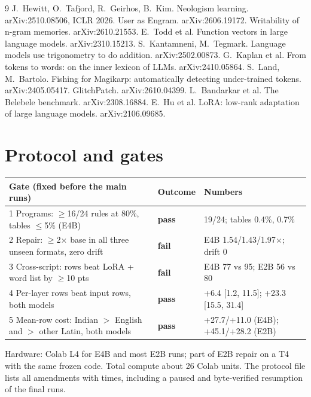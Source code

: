 \documentclass[10pt]{article}
\newcommand{\PASS}{\textcolor{pass}{\textbf{pass}}}\newcommand{\FAIL}{\textcolor{fail}{\textbf{fail}}}
\begin{document}
{\small
\begin{thebibliography}{9}\setlength{\itemsep}{1pt}
 J.~Hewitt, O.~Tafjord, R.~Geirhos, B.~Kim. Neologism learning. arXiv:2510.08506, ICLR 2026.
 User as Engram. arXiv:2606.19172.
 Writability of n-gram memories. arXiv:2610.21553.
 E.~Todd et al. Function vectors in large language models. arXiv:2310.15213.
 S.~Kantamneni, M.~Tegmark. Language models use trigonometry to do addition. arXiv:2502.00873.
 G.~Kaplan et al. From tokens to words: on the inner lexicon of LLMs. arXiv:2410.05864.
 S.~Land, M.~Bartolo. Fishing for Magikarp: automatically detecting under-trained tokens. arXiv:2405.05417.
 GlitchPatch. arXiv:2610.04399.
 L.~Bandarkar et al. The Belebele benchmark. arXiv:2308.16884.
 E.~Hu et al. LoRA: low-rank adaptation of large language models. arXiv:2106.09685.
\end{thebibliography}}

\appendix
\section{Protocol and gates}\label{app:protocol}
{\small\begin{tabular}{@{}p{7.4cm}lp{5cm}@{}}\toprule
Gate (fixed before the main runs) & Outcome & Numbers\\\midrule
1 Programs: $\ge$16/24 rules at 80\%, tables $\le$5\% (E4B) & \PASS & 19/24; tables 0.4\%, 0.7\%\\
2 Repair: $\ge$2$\times$ base in all three unseen formats, zero drift & \FAIL & E4B 1.54/1.43/1.97$\times$; drift 0\\
3 Cross-script: rows beat LoRA + word list by $\ge$10 pts & \FAIL & E4B 77 vs 95; E2B 56 vs 80\\
4 Per-layer rows beat input rows, both models & \PASS & +6.4 [1.2, 11.5]; +23.3 [15.5, 31.4]\\
5 Mean-row cost: Indian $>$ English and $>$ other Latin, both models & \PASS & +27.7/+11.0 (E4B); +45.1/+28.2 (E2B)\\\bottomrule
\end{tabular}}

\smallskip\noindent Hardware: Colab L4 for E4B and most E2B runs; part of E2B repair on a T4 with the same frozen code. Total compute about 26 Colab units. The protocol file lists all amendments with times, including a paused and byte-verified resumption of the final runs.
\end{document}
